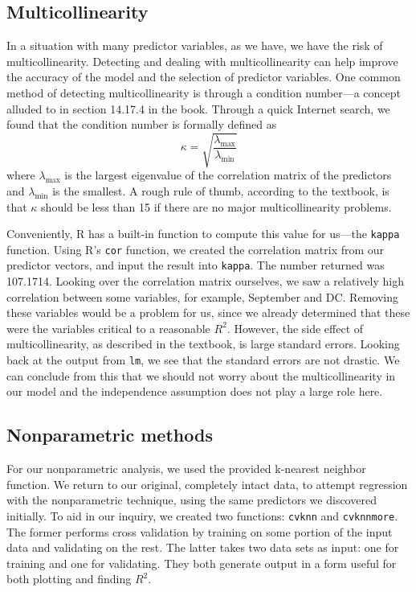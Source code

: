 \documentclass{article}
\begin{document}

\subsection{Multicollinearity}

In a situation with many predictor variables, as we have, we have the risk of
multicollinearity. Detecting and dealing with multicollinearity can help
improve the accuracy of the model and the selection of predictor variables. One
common method of detecting multicollinearity is through a condition number---a
concept alluded to in section 14.17.4 in the book. Through a quick Internet
search, we found that the condition number is formally defined as
\begin{equation*}
    \kappa = \sqrt{ \frac{ \lambda_{\text{max}}}{\lambda_{\text{min}}}}
\end{equation*}
where $\lambda_{\text{max}}$ is the largest eigenvalue of the correlation
matrix of the predictors and $\lambda_{\text{min}}$ is the smallest. A rough
rule of thumb, according to the textbook, is that $\kappa$ should be less than
15 if there are no major multicollinearity problems.

Conveniently, R has a built-in function to compute this value for us---the
\verb=kappa= function. Using R's \verb=cor= function, we created the
correlation matrix from our predictor vectors, and input the result into
\verb=kappa=. The number returned was 107.1714. Looking over the correlation
matrix ourselves, we saw a relatively high correlation between some variables,
for example, September and DC. Removing these variables would be a problem for
us, since we already determined that these were the variables critical to a
reasonable $R^2$. However, the side effect of multicollinearity, as described
in the textbook, is large standard errors. Looking back at the output from
\verb=lm=, we see that the standard errors are not drastic. We can conclude
from this that we should not worry about the multicollinearity in our model and
the independence assumption does not play a large role here.


\subsection{Nonparametric methods}

For our nonparametric analysis, we used the provided k-nearest neighbor
function. We return to our original, completely intact data, to attempt
regression with the nonparametric technique, using the same predictors we
discovered initially. To aid in our inquiry, we created two functions:
\verb=cvknn= and \verb=cvknnmore=. The former performs cross validation by
training on some portion of the input data and validating on the rest. The
latter takes two data sets as input: one for training and one for validating.
They both generate output in a form useful for both plotting and finding $R^2$.
\end{document}
